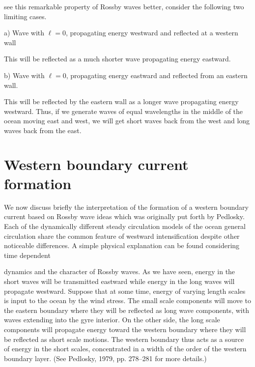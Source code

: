 \sourcepagebreak

see this remarkable property of Rossby waves better, consider the following two
limiting cases.

\noindent a) Wave with $\ell=0$, propagating energy westward and reflected at a western
wall


This will be reflected as a much shorter wave propagating energy eastward.

\noindent b) Wave with $\ell=0$, propagating energy eastward and reflected from an
eastern wall.


This will be reflected by the eastern wall as a longer wave propagating energy
westward. Thus, if we generate waves of equal wavelengths in the middle of the ocean
moving east and west, we will get short waves back from the west and long waves back
from the east.

\section{Western boundary current formation}

We now discuss briefly the interpretation of the formation of a western boundary
current based on Rossby wave ideas which was originally put forth by Pedlosky. Each of
the dynamically different steady circulation models of the ocean general circulation
share the common feature of westward intensification despite other noticeable
differences. A simple physical explanation can be found considering time dependent

\sourcepagebreak

dynamics and the character of Rossby waves. As we have seen, energy in the short
waves will be transmitted eastward while energy in the long waves will propagate
westward. Suppose that at some time, energy of varying length scales is input to the
ocean by the wind stress. The small scale components will move to the eastern boundary
where they will be reflected as long wave components, with waves extending into the
gyre interior. On the other side, the long scale components will propagate energy
toward the western boundary where they will be reflected as short scale motions. The
western boundary thus acts as a source of energy in the short scales, concentrated in a
width of the order of the western boundary layer. (See Pedlosky, 1979, pp. 278--281 for
more details.)

